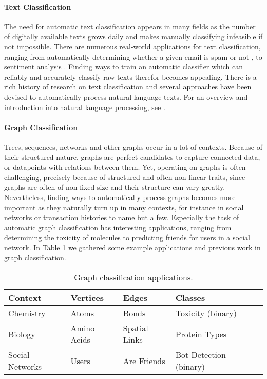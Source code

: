 \paragraph{Text Classification}
The need for automatic text classification appears in many fields as the number of digitally available texts grows daily and makes manually classifying infeasible if not impossible.
There are numerous real-world applications for text classification, ranging from automatically determining whether a given email is spam or not \cite{Yu2008}, to sentiment analysis \cite{Liu2012}.
Finding ways to train an automatic classifier which can reliably and accurately classify raw texts therefor becomes appealing.
There is a rich history of research on text classification and several approaches have been devised to automatically process natural language texts.
For an overview and introduction into natural language processing, see \cite{Manning2000}.

\paragraph{Graph Classification}
Trees, sequences, networks and other graphs occur in a lot of contexts.
Because of their structured nature, graphs are perfect candidates to capture connected data, or datapoints with relations between them.
Yet, operating on graphs is often challenging, precisely because of  structured and often non-linear traits, since graphs are often of non-fixed size and their structure can vary greatly.
Nevertheless, finding ways to automatically process graphs becomes more important as they naturally turn up in many contexts, for instance in social networks or transaction histories to name but a few.
Especially the task of automatic graph classification has interesting applications, ranging from determining the toxicity of molecules to predicting friends for users in a social network.
In Table \ref{table:graph_classification_examples} we gathered some example applications and previous work in graph classification.

\begin{table}[htb!]
\centering
\renewcommand*{\arraystretch}{0.95}
\begin{tabular}{llllr}
\toprule
Context & Vertices & Edges & Classes &  \\
\midrule
Chemistry & Atoms & Bonds & Toxicity (binary) & \cite{Mahe2005} \\
Biology & Amino Acids & Spatial Links & Protein Types & \cite{Vazquez2008} \\ 
Social Networks & Users & Are Friends & Bot Detection (binary) & \cite{Wang2014} \\
\bottomrule
\end{tabular}%
\caption[Table: Graph Classification Applications]{Graph classification applications.}%
\label{table:graph_classification_examples}
\end{table}

